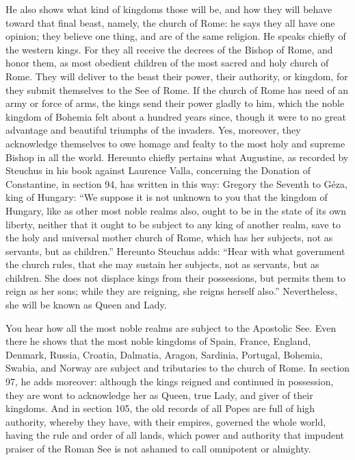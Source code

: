 He also shows what kind of kingdoms those will be, and how they will behave toward that final beast, namely, the church of Rome: he says they all have one opinion; they believe one thing, and are of the same religion. He speaks chiefly of the western kings. For they all receive the decrees of the Bishop of Rome, and honor them, as most obedient children of the most sacred and holy church of Rome. They will deliver to the beast their power, their authority, or kingdom, for they submit themselves to the See of Rome. If the church of Rome has need of an army or force of arms, the kings send their power gladly to him, which the noble kingdom of Bohemia felt about a hundred years since, though it were to no great advantage and beautiful triumphs of the invaders. Yes, moreover, they acknowledge themselves to owe homage and fealty to the most holy and supreme Bishop in all the world. Hereunto chiefly pertains what Augustine, as recorded by Steuchus in his book against Laurence Valla, concerning the Donation of Constantine, in section 94, has written in this way: Gregory the Seventh to Géza, king of Hungary: “We suppose it is not unknown to you that the kingdom of Hungary, like as other most noble realms also, ought to be in the state of its own liberty, neither that it ought to be subject to any king of another realm, save to the holy and universal mother church of Rome, which has her subjects, not as servants, but as children.” Hereunto Steuchus adds: “Hear with what government the church rules, that she may sustain her subjects, not as servants, but as children. She does not displace kings from their possessions, but permits them to reign as her sons; while they are reigning, she reigns herself also.” Nevertheless, she will be known as Queen and Lady.

You hear how all the most noble realms are subject to the Apostolic See. Even there he shows that the most noble kingdoms of Spain, France, England, Denmark, Russia, Croatia, Dalmatia, Aragon, Sardinia, Portugal, Bohemia, Swabia, and Norway are subject and tributaries to the church of Rome. In section 97, he adds moreover: although the kings reigned and continued in possession, they are wont to acknowledge her as Queen, true Lady, and giver of their kingdoms. And in section 105, the old records of all Popes are full of high authority, whereby they have, with their empires, governed the whole world, having the rule and order of all lands, which power and authority that impudent praiser of the Roman See is not ashamed to call omnipotent or almighty.

